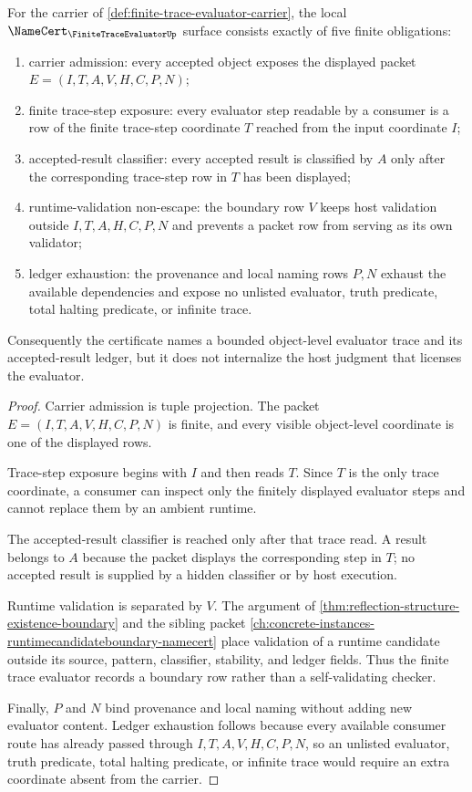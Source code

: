 \begin{theorem}
\label{thm:finite-trace-evaluator-namecert-obligations}
For the carrier of \autoref{def:finite-trace-evaluator-carrier}, the local $\NameCert_{\FiniteTraceEvaluatorUp}$ surface consists exactly of five finite obligations:
\begin{enumerate}
\item carrier admission: every accepted object exposes the displayed packet $E=(I,T,A,V,H,C,P,N)$;
\item finite trace-step exposure: every evaluator step readable by a consumer is a row of the finite trace-step coordinate $T$ reached from the input coordinate $I$;
\item accepted-result classifier: every accepted result is classified by $A$ only after the corresponding trace-step row in $T$ has been displayed;
\item runtime-validation non-escape: the boundary row $V$ keeps host validation outside $I,T,A,H,C,P,N$ and prevents a packet row from serving as its own validator;
\item ledger exhaustion: the provenance and local naming rows $P,N$ exhaust the available dependencies and expose no unlisted evaluator, truth predicate, total halting predicate, or infinite trace.
\end{enumerate}
Consequently the certificate names a bounded object-level evaluator trace and its accepted-result ledger, but it does not internalize the host judgment that licenses the evaluator.
\end{theorem}
\begin{proof}
Carrier admission is tuple projection. The packet $E=(I,T,A,V,H,C,P,N)$ is finite, and every visible object-level coordinate is one of the displayed rows.

Trace-step exposure begins with $I$ and then reads $T$. Since $T$ is the only trace coordinate, a consumer can inspect only the finitely displayed evaluator steps and cannot replace them by an ambient runtime.

The accepted-result classifier is reached only after that trace read. A result belongs to $A$ because the packet displays the corresponding step in $T$; no accepted result is supplied by a hidden classifier or by host execution.

Runtime validation is separated by $V$. The argument of \autoref{thm:reflection-structure-existence-boundary} and the sibling packet \autoref{ch:concrete-instances-runtimecandidateboundary-namecert} place validation of a runtime candidate outside its source, pattern, classifier, stability, and ledger fields. Thus the finite trace evaluator records a boundary row rather than a self-validating checker.

Finally, $P$ and $N$ bind provenance and local naming without adding new evaluator content. Ledger exhaustion follows because every available consumer route has already passed through $I,T,A,V,H,C,P,N$, so an unlisted evaluator, truth predicate, total halting predicate, or infinite trace would require an extra coordinate absent from the carrier.
\end{proof}

